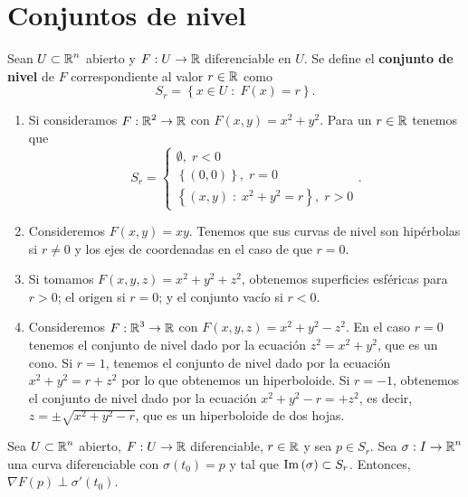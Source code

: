 \section{Conjuntos de nivel}
\begin{definition}
Sean $\displaystyle U \subset \mathbb{R}^{n} $ abierto y $\displaystyle F : U \to \mathbb{R} $ diferenciable en $\displaystyle U $. Se define el \textbf{conjunto de nivel} de $\displaystyle F $ correspondiente al valor $\displaystyle r \in \mathbb{R} $ como 
\[S_{r} = \left\{ x \in U \; : \; F\left(x\right) = r\right\}  .\]
\end{definition}
\begin{eg}
\begin{enumerate}
\item Si consideramos $\displaystyle F : \mathbb{R}^{2} \to \mathbb{R} $ con $\displaystyle F\left(x,y\right) = x^{2}+y^{2} $. Para un $\displaystyle r \in \mathbb{R} $ tenemos que 
	\[S_{r} = 
	\begin{cases}
	\emptyset, \; r < 0 \\ 
	\left\{ \left(0,0\right)\right\} , \; r = 0 \\
	\left\{ \left(x,y\right) \; : \; x^{2} +y^{2} = r\right\} , \; r > 0
	\end{cases}
	.\]
\item Consideremos $\displaystyle F\left(x,y\right) = xy $. Tenemos que sus curvas de nivel son hipérbolas si $\displaystyle r \neq 0 $ y los ejes de coordenadas en el caso de que $\displaystyle r = 0 $. 	
\item Si tomamos $\displaystyle F\left(x,y,z\right) = x^{2}+y^{2}+z^{2} $, obtenemos superficies esféricas para $\displaystyle r > 0 $; el origen si $\displaystyle r = 0 $; y el conjunto vacío si $\displaystyle r < 0 $.
\item Consideremos $\displaystyle F : \mathbb{R}^{3} \to \mathbb{R} $ con $\displaystyle F\left(x,y,z\right)= x^{2}+y^{2} -z^{2} $. En el caso $\displaystyle r = 0 $ tenemos el conjunto de nivel dado por la ecuación $\displaystyle z^{2} = x^{2} +y^{2} $, que es un cono. Si $\displaystyle r = 1 $, tenemos el conjunto de nivel dado por la ecuación $\displaystyle x^{2}+y^{2} = r + z^{2} $ por lo que obtenemos un hiperboloide. Si $\displaystyle r = -1 $, obtenemos el conjunto de nivel dado por la ecuación $\displaystyle x^{2} +y^{2} - r = + z^{2} $, es decir, $\displaystyle z = \pm\sqrt{x^{2}+y^{2}-r} $, que es un hiperboloide de dos hojas.
\end{enumerate}
\end{eg}
\begin{prop}
Sea $\displaystyle U \subset \mathbb{R}^{n} $ abierto, $\displaystyle F : U \to \mathbb{R} $ diferenciable, $\displaystyle r \in \mathbb{R} $ y sea $\displaystyle p \in S_{r} $. Sea $\displaystyle \sigma : I \to \mathbb{R}^{n} $ una curva diferenciable con $\displaystyle \sigma\left(t_{0}\right) = p $ y tal que $\displaystyle \operatorname{Im}\left(\sigma \right)\subset S_{r} $. Entonces, $\displaystyle \nabla F\left(p\right) \perp \sigma'\left(t_{0}\right) $.
\end{prop}
